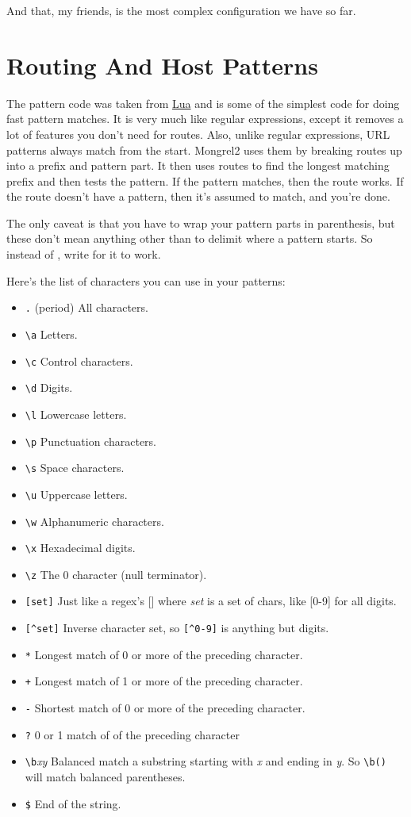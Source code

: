 And that, my friends, is the most complex configuration we have so far.


\section{Routing And Host Patterns}

The pattern code was taken from \href{http://www.lua.org/}{Lua} and is some of
the simplest code for doing fast pattern matches.  It is very much like regular
expressions, except it removes a lot of features you don't need for routes.
Also, unlike regular expressions, URL patterns always match from the start.
Mongrel2 uses them by breaking routes up into a prefix and pattern part.  It
then uses routes to find the longest matching prefix and then tests the
pattern.  If the pattern matches, then the route works.  If the route doesn't
have a pattern, then it's assumed to match, and you're done.

The only caveat is that you have to wrap your pattern parts in parenthesis, but these don't mean anything
other than to delimit where a pattern starts.  So instead of , write 
for it to work.

Here's the list of characters you can use in your patterns:

\begin{itemize}
\item \verb|.| (period) All characters.
\item \verb|\a| Letters.
\item \verb|\c| Control characters.
\item \verb|\d| Digits.
\item \verb|\l| Lowercase letters.
\item \verb|\p| Punctuation characters.
\item \verb|\s| Space characters.
\item \verb|\u| Uppercase letters.
\item \verb|\w| Alphanumeric characters.
\item \verb|\x| Hexadecimal digits.
\item \verb|\z| The 0 character (null terminator).
\item \verb|[set]| Just like a regex's [] where \emph{set} is a set of chars, like [0-9] for all digits.
\item \verb|[^set]| Inverse character set, so \verb|[^0-9]| is anything but digits.
\item \verb|*| Longest match of 0 or more of the preceding character.
\item \verb|+| Longest match of 1 or more of the preceding character.
\item \verb|-| Shortest match of 0 or more of the preceding character.
\item \verb|?| 0 or 1 match of of the preceding character
\item \verb|\b|\emph{xy} Balanced match a substring starting with \emph{x}
  and ending in \emph{y}.  So \verb|\b()| will match balanced parentheses.
\item \verb|$| End of the string.
\end{itemize}

